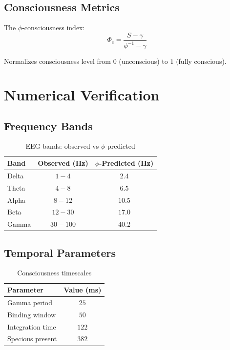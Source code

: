\documentclass[12pt,a4paper]{article}
\begin{document}
\subsection{Consciousness Metrics}

The $\phi$-consciousness index:
\begin{equation}
\Phi_c = \frac{S - \gamma}{\phi^{-1} - \gamma}
\end{equation}

Normalizes consciousness level from $0$ (unconscious) to $1$ (fully conscious).

\section{Numerical Verification}

\subsection{Frequency Bands}

\begin{table}[h]
\centering
\begin{tabular}{lcc}
\toprule
Band & Observed (Hz) & $\phi$-Predicted (Hz) \\
\midrule
Delta & $1-4$ & $2.4$ \\
Theta & $4-8$ & $6.5$ \\
Alpha & $8-12$ & $10.5$ \\
Beta & $12-30$ & $17.0$ \\
Gamma & $30-100$ & $40.2$ \\
\bottomrule
\end{tabular}
\caption{EEG bands: observed vs $\phi$-predicted}
\end{table}

\subsection{Temporal Parameters}

\begin{table}[h]
\centering
\begin{tabular}{lc}
\toprule
Parameter & Value (ms) \\
\midrule
Gamma period & $25$ \\
Binding window & $50$ \\
Integration time & $122$ \\
Specious present & $382$ \\
\bottomrule
\end{tabular}
\caption{Consciousness timescales}
\end{table}
\end{document}

